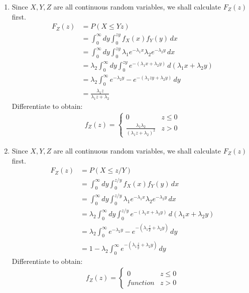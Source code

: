 \documentclass[hidelinks]{article}
\begin{document}
\begin{enumerate}
    \item Since $X,Y,Z$ are all continuous random variables, we shall calculate $F_Z(z)$ first.
    \begin{align*}
        F_Z(z)  &= P(X \leq Yz)   \\
                &= \int^\infty_{0}dy\int^{zy}_{0} f_X(x)f_Y(y) \, dx \\
                &= \int^\infty_{0}dy\int^{zy}_{0} \lambda_1 e^{-\lambda_1 x}\lambda_2 e^{-\lambda_2 y} \, dx \\
                &=\lambda_2\int^\infty_{0}dy\int^{zy}_{0} e^{-(\lambda_1 x+\lambda_2 y)} \, d(\lambda_1 x + \lambda_2 y) \\
                &=\lambda_2\int^\infty_{0} e^{-\lambda_2y} - e^{-(\lambda_1 zy+\lambda_2 y)} \,dy \\
                &= \frac{\lambda_1 z}{\lambda_1 z + \lambda_2}
    \end{align*}
    Differentiate to obtain:
    \begin{align*}
        f_Z(z) = 
        \begin{cases}
            0 & z \leq 0 \\
            \frac{\lambda_1 \lambda_2}{(\lambda_1 z + \lambda_2)^2} & z > 0
        \end{cases}
    \end{align*}
    
    \item Since $X,Y,Z$ are all continuous random variables, we shall calculate $F_Z(z)$ first.
    \begin{align*}
        F_Z(z)  &= P(X \leq z/Y)   \\
                &= \int^\infty_{0}dy\int^{z/y}_{0} f_X(x)f_Y(y) \, dx \\
                &= \int^\infty_{0}dy\int^{z/y}_{0} \lambda_1 e^{-\lambda_1 x}\lambda_2 e^{-\lambda_2 y} \, dx \\
                &=\lambda_2\int^\infty_{0}dy\int^{z/y}_{0} e^{-(\lambda_1 x+\lambda_2 y)} \, d(\lambda_1 x + \lambda_2 y) \\
                &=\lambda_2\int^\infty_{0} e^{-\lambda_2y} - e^{-(\lambda_1 \frac{z}{y}+\lambda_2 y)} \,dy \\
                &= 1 - \lambda_2 \int^\infty_0 e^{-(\lambda_1 \frac{z}{y}+\lambda_2 y)} \,dy
    \end{align*}
    Differentiate to obtain:
    \begin{align*}
        f_Z(z) = 
        \begin{cases}
            0 & z \leq 0 \\
            function & z > 0
        \end{cases}
    \end{align*}
\end{enumerate}
\end{document}
